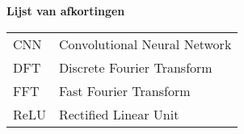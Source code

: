 \Large
\textbf{Lijst van afkortingen}
\newline
\small
\begin{table}[ht]
\small
\begin{tabular}{ll}
CNN & Convolutional Neural Network \\
DFT	& Discrete Fourier Transform \\
FFT & Fast Fourier Transform \\
ReLU & Rectified Linear Unit \\
\end{tabular}
\end{table}

\newpage
